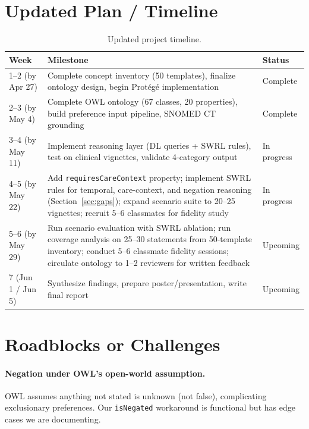 \documentclass[11pt]{article}
\newcommand{\onto}[1]{\texttt{#1}}
\begin{document}
\section{Updated Plan / Timeline}

\begin{table}[ht]
\centering
\caption{Updated project timeline.}
\label{tab:timeline}
\small
\begin{tabular}{L{2.5cm} L{9cm} L{2cm}}
\toprule
\textbf{Week} & \textbf{Milestone} & \textbf{Status} \\
--2 (by Apr 27) & Complete concept inventory (50 templates), finalize ontology design, begin Prot\'eg\'e implementation & Complete \\[4pt]
2--3 (by May 4) & Complete OWL ontology (67 classes, 20 properties), build preference input pipeline, SNOMED CT grounding & Complete \\[4pt]
3--4 (by May 11) & Implement reasoning layer (DL queries + SWRL rules), test on clinical vignettes, validate 4-category output & In progress \\[4pt]
4--5 (by May 22) & Add \onto{requiresCareContext} property; implement SWRL rules for temporal, care-context, and negation reasoning (Section~\ref{sec:gaps}); expand scenario suite to 20--25 vignettes; recruit 5--6 classmates for fidelity study & In progress \\[4pt]
5--6 (by May 29) & Run scenario evaluation with SWRL ablation; run coverage analysis on 25--30 statements from 50-template inventory; conduct 5--6 classmate fidelity sessions; circulate ontology to 1--2 reviewers for written feedback & Upcoming \\[4pt]
7 (Jun 1 / Jun 5) & Synthesize findings, prepare poster/presentation, write final report & Upcoming \\
\bottomrule
\end{tabular}
\end{table}

\section{Roadblocks or Challenges}

\paragraph{Negation under OWL's open-world assumption.}
OWL assumes anything not stated is unknown (not false), complicating exclusionary preferences. Our \onto{isNegated} workaround is functional but has edge cases we are documenting.
\end{document}
